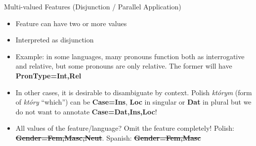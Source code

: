 \documentclass[10pt, compress, aspectratio=169]{beamer}
\newcommand{\feat}[1]{\textbf{\footnotesize\color{red}#1}}
\begin{document}
\begin{frame}{Multi-valued Features (Disjunction / Parallel Application)}
\begin{itemize}
\item Feature can have two or more values
\item Interpreted as disjunction
\item Example: in some languages, many pronouns function both as interrogative and relative, but some pronouns are only relative. The former will have \feat{PronType=Int,Rel}
\item In other cases, it is desirable to disambiguate by context. Polish \textit{którym} (form of \textit{który} ``which'') can be \feat{Case=Ins}, \feat{Loc} in singular or \feat{Dat} in plural but we do not want to annotate \feat{Case=Dat,Ins,Loc}!
\item All values of the feature/language? Omit the feature completely! Polish: \feat{\sout{Gender=Fem,Masc,Neut}}. Spanish: \feat{\sout{Gender=Fem,Masc}}
\end{itemize}
\end{frame}
\end{document}
